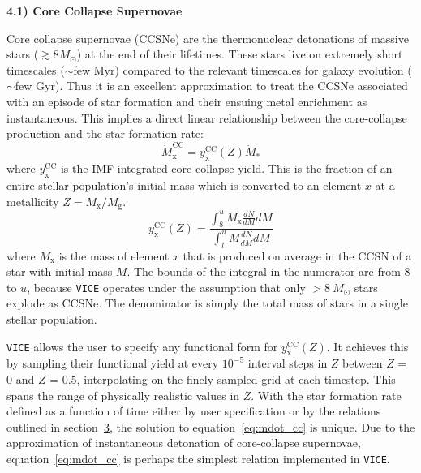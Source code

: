 \documentclass{report}
\newcommand\ddfrac[2]{\frac{\displaystyle #1}{\displaystyle #2}}
\begin{document}
\null\par\noindent
\hypertarget{sec:ccsne}{\textbf{4.1) Core Collapse Supernovae}} 
\par\noindent
Core collapse supernovae (CCSNe) are the thermonuclear detonations of massive 
stars ($\gtrsim8M_\odot$) at the end of their lifetimes. These stars live on 
extremely short timescales ($\sim$few Myr) compared to the relevant timescales 
for galaxy evolution ($\sim$few Gyr). Thus it is an excellent approximation to 
treat the CCSNe associated with an episode of star formation and their ensuing 
metal enrichment as instantaneous. This implies a direct linear relationship 
between the core-collapse production and the star formation rate: 
\begin{equation}
\label{eq:mdot_cc}
\dot{M}_\text{x}^\text{CC} = y_\text{x}^\text{CC}(Z)\dot{M}_*
\end{equation}
where $y_\text{x}^\text{CC}$ is the IMF-integrated core-collapse yield. This 
is the fraction of an entire stellar population's initial mass which is 
converted to an element $x$ at a metallicity $Z = M_\text{x}/M_\text{g}$. 
\begin{equation}
y_\text{x}^\text{CC}(Z) = \ddfrac{
	\int_8^u M_\text{x}\ddfrac{dN}{dM}dM
}{
	\int_l^u M\ddfrac{dN}{dM}dM
}
\end{equation}
where $M_\text{x}$ is the mass of element $x$ that is produced on average in 
the CCSN of a star with initial mass $M$. The bounds of the integral in the 
numerator are from 8 to $u$, because \texttt{VICE} operates under the 
assumption that only $>8\ M_\odot$ stars explode as CCSNe. The denominator is 
simply the total mass of stars in a single stellar population. 
\par
\texttt{VICE} allows the user to specify any functional form for 
$y_\text{x}^\text{CC}(Z)$. It achieves this by sampling their functional yield 
at every $10^{-5}$ interval steps in $Z$ between $Z$ = 0 and $Z$ = 0.5, 
interpolating on the finely sampled grid at each timestep. This spans the 
range of physically realistic values in $Z$. With the star formation rate  
defined as a function of time either by user specification or by the 
relations outlined in section~\hyperlink{sec:gas_supply}{3}, the solution to 
equation~\ref{eq:mdot_cc} is unique. Due to the approximation of instantaneous 
detonation of core-collapse supernovae, equation~\ref{eq:mdot_cc} is perhaps 
the simplest relation implemented in \texttt{VICE}. 
\end{document}
